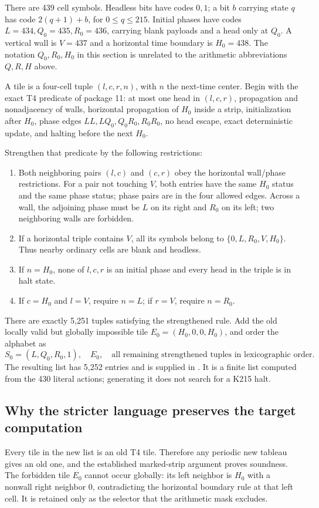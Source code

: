 \documentclass[11pt,letterpaper]{article}
\theoremstyle{remark}\newtheorem{remark}[theorem]{Remark}
\newcommand{\pathtext}[1]{\texttt{\detokenize{#1}}}
\begin{document}
There are 439 cell symbols. Headless bits have codes $0,1$; a bit $b$ carrying
state $q$ has code $2(q+1)+b$, for $0\leq q\leq215$. Initial phases have
codes $L=434,Q_0=435,R_0=436$, carrying blank payloads and a head only at
$Q_0$. A vertical wall is $V=437$ and a horizontal time boundary is $H_0=438$.
The notation $Q_0,R_0,H_0$ in this section is unrelated to the arithmetic
abbreviations $Q,R,H$ above.

A tile is a four-cell tuple $(l,c,r,n)$, with $n$ the next-time center.
Begin with the exact T4 predicate of package 11: at most one head in
$(l,c,r)$, propagation and nonadjacency of walls, horizontal propagation of
$H_0$ inside a strip, initialization after $H_0$, phase edges
$LL,LQ_0,Q_0R_0,R_0R_0$, no head escape, exact deterministic update, and
halting before the next $H_0$.

Strengthen that predicate by the following restrictions:
\begin{enumerate}
\item Both neighboring pairs $(l,c)$ and $(c,r)$ obey the horizontal
wall/phase restrictions. For a pair not touching $V$, both entries have the
same $H_0$ status and the same phase status; phase pairs are in the four
allowed edges. Across a wall, the adjoining phase must be $L$ on its right
and $R_0$ on its left; two neighboring walls are forbidden.
\item If a horizontal triple contains $V$, all its symbols belong to
$\{0,L,R_0,V,H_0\}$. Thus nearby ordinary cells are blank and headless.
\item If $n=H_0$, none of $l,c,r$ is an initial phase and every head in the
triple is in halt state.
\item If $c=H_0$ and $l=V$, require $n=L$; if $r=V$, require $n=R_0$.
\end{enumerate}
There are exactly 5,251 tuples satisfying the strengthened rule. Add the
old locally valid but globally impossible tile
$E_0=(H_0,0,0,H_0)$, and order the alphabet as
\[
 S_0=(L,Q_0,R_0,1),\quad E_0,\quad
 \text{all remaining strengthened tuples in lexicographic order}.
\]
The resulting list has 5,252 entries and is supplied in
\pathtext{data/strict_windows.json}. It is a finite list computed from the
430 literal actions; generating it does not search for a K215 halt.

\subsection{Why the stricter language preserves the target computation}
Every tile in the new list is an old T4 tile. Therefore any periodic new
tableau gives an old one, and the established marked-strip argument proves
soundness. The forbidden tile $E_0$ cannot occur globally: its left neighbor
is $H_0$ with a nonwall right neighbor $0$, contradicting the horizontal
boundary rule at that left cell. It is retained only as the selector that
the arithmetic mask excludes.
\end{document}

